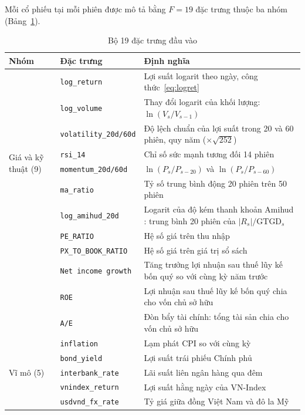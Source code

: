 Mỗi cổ phiếu tại mỗi phiên được mô tả bằng $F=19$ đặc trưng thuộc ba nhóm (Bảng~\ref{tab:features}).

\begin{table}[ht]
\centering\small
\caption{Bộ 19 đặc trưng đầu vào}
\label{tab:features}
\begin{tabularx}{\textwidth}{@{}p{2.2cm}p{3.3cm}X@{}}
\toprule
Nhóm & Đặc trưng & Định nghĩa \\
\midrule
\multirow{9}{2.2cm}{Giá và kỹ thuật (9)}
 & \texttt{log\_return} & Lợi suất logarit theo ngày, công thức~\eqref{eq:logret} \\
 & \texttt{log\_volume} & Thay đổi logarit của khối lượng: $\ln(V_s/V_{s-1})$ \\
 & \texttt{volatility\_20d/60d} & Độ lệch chuẩn của lợi suất trong 20 và 60 phiên, quy năm ($\times\sqrt{252}$) \\
 & \texttt{rsi\_14} & Chỉ số sức mạnh tương đối 14 phiên \cite{wilder1978} \\
 & \texttt{momentum\_20d/60d} & $\ln(P_s/P_{s-20})$ và $\ln(P_s/P_{s-60})$ \\
 & \texttt{ma\_ratio} & Tỷ số trung bình động 20 phiên trên 50 phiên \\
 & \texttt{log\_amihud\_20d} & Logarit của độ kém thanh khoản Amihud \cite{amihud2002}: trung bình 20 phiên của $|R_s|/\text{GTGD}_s$ \\
\midrule
\multirow{5}{2.2cm}{Tài chính doanh nghiệp (5)}
 & \texttt{PE\_RATIO} & Hệ số giá trên thu nhập \\
 & \texttt{PX\_TO\_BOOK\_RATIO} & Hệ số giá trên giá trị sổ sách \\
 & \texttt{Net income growth} & Tăng trưởng lợi nhuận sau thuế lũy kế bốn quý so với cùng kỳ năm trước \\
 & \texttt{ROE} & Lợi nhuận sau thuế lũy kế bốn quý chia cho vốn chủ sở hữu \\
 & \texttt{A/E} & Đòn bẩy tài chính: tổng tài sản chia cho vốn chủ sở hữu \\
\midrule
\multirow{5}{2.2cm}{Vĩ mô (5)}
 & \texttt{inflation} & Lạm phát CPI so với cùng kỳ \\
 & \texttt{bond\_yield} & Lợi suất trái phiếu Chính phủ \\
 & \texttt{interbank\_rate} & Lãi suất liên ngân hàng qua đêm \\
 & \texttt{vnindex\_return} & Lợi suất hằng ngày của VN-Index \\
 & \texttt{usdvnd\_fx\_rate} & Tỷ giá giữa đồng Việt Nam và đô la Mỹ \\
\bottomrule
\end{tabularx}
\end{table}

